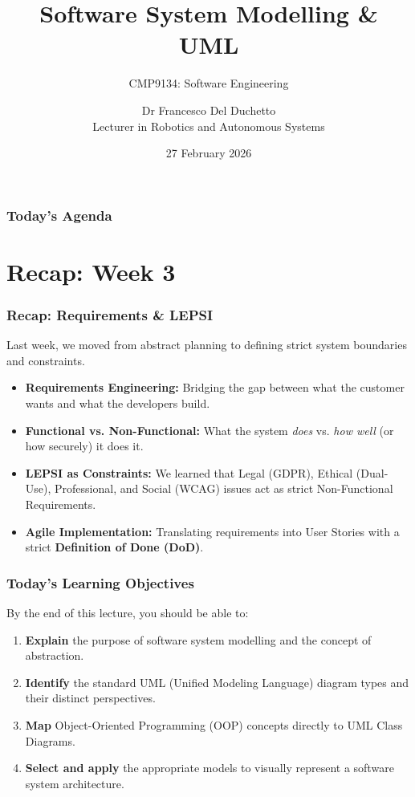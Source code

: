 \documentclass[xcolor=table]{beamer}
\title[CMP9134 - Week 4]{Software System Modelling \& UML}
\subtitle{CMP9134: Software Engineering}
\author[Francesco Del Duchetto]{Dr Francesco Del Duchetto\\Lecturer in Robotics and Autonomous Systems}
\institute[University of Lincoln]{University of Lincoln}
\date{27 February 2026}
\begin{document}
\begin{frame}
    \titlepage
\end{frame}

\begin{frame}
    \frametitle{Today's Agenda}
    \tableofcontents
\end{frame}

\section{Recap: Week 3}

\begin{frame}
    \frametitle{Recap: Requirements \& LEPSI}
    Last week, we moved from abstract planning to defining strict system boundaries and constraints.
    
    \begin{itemize}
        \item \textbf{Requirements Engineering:} Bridging the gap between what the customer wants and what the developers build.
        \item \textbf{Functional vs. Non-Functional:} What the system \textit{does} vs. \textit{how well} (or how securely) it does it.
        \item \textbf{LEPSI as Constraints:} We learned that Legal (GDPR), Ethical (Dual-Use), Professional, and Social (WCAG) issues act as strict Non-Functional Requirements.
        \item \textbf{Agile Implementation:} Translating requirements into User Stories with a strict \textbf{Definition of Done (DoD)}.
    \end{itemize}
\end{frame}

\begin{frame}
    \frametitle{Today's Learning Objectives}
    By the end of this lecture, you should be able to:
    \begin{enumerate}
        \item \textbf{Explain} the purpose of software system modelling and the concept of abstraction.
        \item \textbf{Identify} the standard UML (Unified Modeling Language) diagram types and their distinct perspectives.
        \item \textbf{Map} Object-Oriented Programming (OOP) concepts directly to UML Class Diagrams.
        \item \textbf{Select and apply} the appropriate models to visually represent a software system architecture.
    \end{enumerate}
\end{frame}
\end{document}
